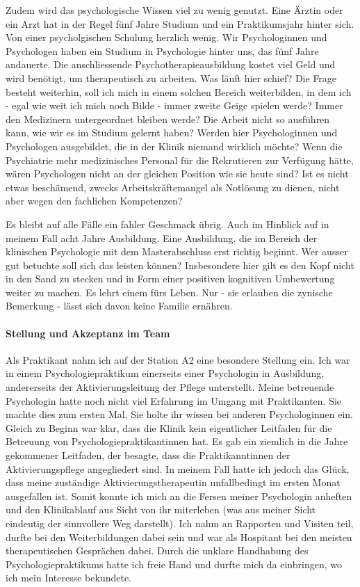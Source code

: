 Zudem wird das psychologische Wissen viel zu wenig genutzt. Eine Ärztin oder ein Arzt hat in der Regel fünf Jahre Studium und ein Praktikumsjahr hinter sich. Von einer psycholgischen Schulung herzlich wenig. Wir Psychologinnen und Psychologen haben ein Studium in Psychologie hinter uns, das fünf Jahre andauerte. Die anschliessende Psychotherapieausbildung kostet viel Geld und wird benötigt, um therapeutisch zu arbeiten. Was läuft hier schief? Die Frage besteht weiterhin, soll ich mich in einem solchen Bereich weiterbilden, in dem ich - egal wie weit ich mich noch Bilde - immer zweite Geige spielen werde? Immer den Medizinern untergeordnet bleiben werde? Die Arbeit nicht so ausführen kann, wie wir es im Studium gelernt haben? Werden hier Psychologinnen und Psychologen ausgebildet, die in der Klinik niemand wirklich möchte? Wenn die Psychiatrie mehr medizinisches Personal für die Rekrutieren zur Verfügung hätte, wären Psychologen nicht an der gleichen Position wie sie heute sind? Ist es nicht etwas beschämend, zwecks Arbeitskräftemangel als Notlösung zu dienen, nicht aber wegen den fachlichen Kompetenzen? 

Es bleibt auf alle Fälle ein fahler Geschmack übrig. Auch im Hinblick auf in meinem Fall acht Jahre Ausbildung. Eine Ausbildung, die im Bereich der klinischen Psychologie mit dem Masterabschluss erst richtig beginnt. Wer ausser gut betuchte soll sich das leisten können? Insbesondere hier gilt es den Kopf nicht in den Sand zu stecken und in Form einer positiven kognitiven Umbewertung weiter zu machen. Es lehrt einem fürs Leben. Nur - sie erlauben die zynische Bemerkung - lässt sich davon keine Familie ernähren.  

\paragraph{Stellung und Akzeptanz im Team}
Als Praktikant nahm ich auf der Station A2 eine besondere Stellung ein. Ich war in einem Psychologiepraktikum einerseits einer Psychologin in Ausbildung, andererseits der Aktivierungsleitung der Pflege unterstellt. Meine betreuende Psychologin hatte noch nicht viel Erfahrung im Umgang mit Praktikanten. Sie machte dies zum ersten Mal. Sie holte ihr wissen bei anderen Psychologinnen ein. Gleich zu Beginn war klar, dass die Klinik kein eigentlicher Leitfaden für die Betreuung von Psychologiepraktikantinnen hat. Es gab ein ziemlich in die Jahre gekommener Leitfaden, der besagte, dass die Praktikanntinnen der Aktivierungspflege angegliedert sind. In meinem Fall hatte ich jedoch das Glück, dass meine zuständige Aktivierungstherapeutin unfallbedingt im ersten Monat ausgefallen ist. Somit konnte ich mich an die Fersen meiner Psychologin anheften und den Klinikablauf aus Sicht von ihr miterleben (was aus meiner Sicht eindeutig der sinnvollere Weg darstellt). Ich nahm an Rapporten und Visiten teil, durfte bei den Weiterbildungen dabei sein und war als Hospitant bei den meisten therapeutischen Gesprächen dabei. Durch die unklare Handhabung des Psychologiepraktikums hatte ich freie Hand und durfte mich da einbringen, wo ich mein Interesse bekundete. 

